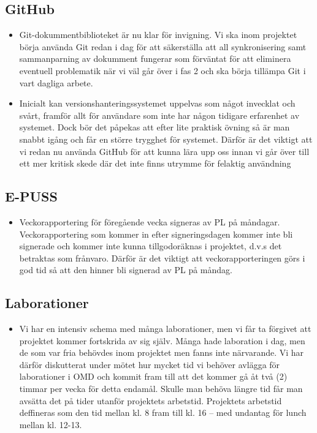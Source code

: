 \documentclass[paper=a4, fontsize=11pt,twoside]{article}
\begin{document}
\subsection{GitHub}
\begin{itemize}
  \item Git-dokummentbiblioteket är nu klar för invigning. Vi ska inom projektet börja använda Git redan i dag för 
  att säkerställa att all synkronisering samt sammanparning av dokumment fungerar som förväntat för att 
  eliminera eventuell problematik när vi väl går över i fas 2 och ska börja tillämpa Git i vart dagliga arbete.
  \item Inicialt kan versionshanteringssystemet uppelvas som något invecklat och svårt, framför allt för användare
  som inte har någon tidigare erfarenhet av systemet. Dock bör det påpekas att efter lite praktisk övning så
  är man snabbt igång och får en större trygghet för systemet. Därför är det viktigt att vi redan nu använda
  GitHub för att kunna lära upp oss innan vi går över till ett mer kritisk skede där det inte finns utrymme 
  för felaktig användning
\end{itemize}

\subsection{E-PUSS}
\begin{itemize}
  \item Veckorapportering för föregående vecka signeras av PL på måndagar. Veckorapportering som kommer in efter
  signeringsdagen kommer inte bli signerade och kommer inte kunna tillgodoräknas i projektet, d.v.s 
  det betraktas som frånvaro. Därför är det viktigt att veckorapporteringen görs i god tid så att den hinner
  bli signerad av PL på måndag.
\end{itemize}

\subsection{Laborationer}
\begin{itemize}
  \item Vi har en intensiv schema med många laborationer, men vi får ta förgivet att projektet kommer fortskrida av
  sig själv. Många hade laboration i dag, men de som var fria behövdes inom projektet men fanns inte närvarande.
  Vi har därför diskutterat under mötet hur mycket tid vi behöver avlägga för laborationer i OMD
  och kommit fram till att det kommer gå åt två (2) timmar per vecka för detta endamål. Skulle man behöva
  längre tid får man avsätta det på tider utanför projektets arbetstid. Projektets arbetstid deffineras som 
  den tid mellan kl. 8 fram till kl. 16 – med undantag för lunch mellan kl. 12-13.
\end{itemize}
\end{document}
